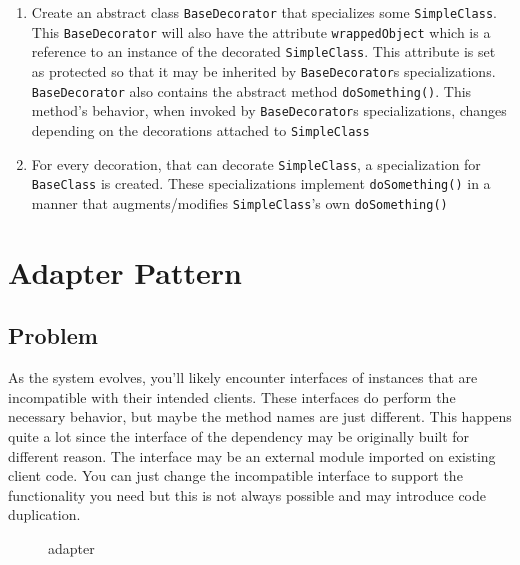 \begin{enumerate}
\def\labelenumi{\arabic{enumi}.}
\tightlist
\item
  Create an abstract class \texttt{BaseDecorator} that specializes some
  \texttt{SimpleClass}. This \texttt{BaseDecorator} will also have the
  attribute \texttt{wrappedObject} which is a reference to an instance
  of the decorated \texttt{SimpleClass}. This attribute is set as
  protected so that it may be inherited by \texttt{BaseDecorator}s
  specializations. \texttt{BaseDecorator} also contains the abstract
  method \texttt{doSomething()}. This method's behavior, when invoked by
  \texttt{BaseDecorator}s specializations, changes depending on the
  decorations attached to \texttt{SimpleClass}
\item
  For every decoration, that can decorate \texttt{SimpleClass}, a
  specialization for \texttt{BaseClass} is created. These
  specializations implement \texttt{doSomething()} in a manner that
  augments/modifies \texttt{SimpleClass}'s own \texttt{doSomething()}
\end{enumerate}

\section{Adapter Pattern}\label{structural-patterns.md__adapter-pattern}

\subsection{Problem}\label{structural-patterns.md__problem-1}

As the system evolves, you'll likely encounter interfaces of instances
that are incompatible with their intended clients. These interfaces do
perform the necessary behavior, but maybe the method names are just
different. This happens quite a lot since the interface of the
dependency may be originally built for different reason. The interface
may be an external module imported on existing client code. You can just
change the incompatible interface to support the functionality you need
but this is not always possible and may introduce code duplication.

\begin{figure}
\centering
{}
\caption{adapter}
\end{figure}


